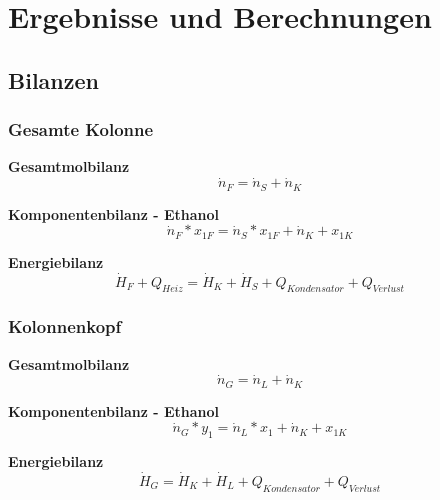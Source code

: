 \newpage
\section{Ergebnisse und Berechnungen}
\label{sec:ergebnisse}

\subsection{Bilanzen}
\subsubsection{Gesamte Kolonne}

\hspace{5mm}\textbf{Gesamtmolbilanz}\\
\begin{equation}
\dot{n}_F=\dot{n}_S+\dot{n}_K
\end{equation}

\hspace{5mm}\textbf{Komponentenbilanz - Ethanol} \\
\begin{equation}
\dot{n}_F*x_{1F}=\dot{n}_S*x_{1F}+\dot{n}_K+x_{1K}
\end{equation}

\hspace{5mm}\textbf{Energiebilanz}\\
\begin{equation}
\dot{H}_F+Q_{Heiz}=\dot{H}_K+\dot{H}_S+Q_{Kondensator}+Q_{Verlust}
\end{equation}


\subsubsection{Kolonnenkopf}

\hspace{5mm}\textbf{Gesamtmolbilanz}\\
\begin{equation}
\dot{n}_G=\dot{n}_L+\dot{n}_K
\end{equation}

\hspace{5mm}\textbf{Komponentenbilanz - Ethanol} \\
\begin{equation}
\dot{n}_G*y_{1}=\dot{n}_L*x_{1}+\dot{n}_K+x_{1K}
\end{equation}

\hspace{5mm}\textbf{Energiebilanz}\\
\begin{equation}
\dot{H}_G=\dot{H}_K+\dot{H}_L+Q_{Kondensator}+Q_{Verlust}
\end{equation}